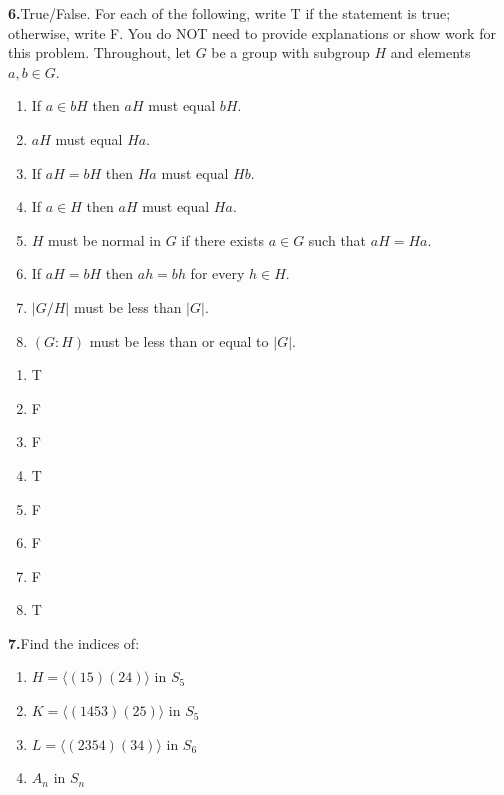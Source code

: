 \documentclass[10pt,]{book}
\theoremstyle{plain}
\theoremstyle{definition}
\theoremstyle{definition}
\theoremstyle{definition}
\theoremstyle{definition}
\numberwithin{equation}{section}
\begin{document}
%
\par\smallskip
\noindent\textbf{6.}\quad{}True/False. For each of the following, write T if the statement is true; otherwise, write F. You do NOT need to provide explanations or show work for this problem. Throughout, let \(G\) be a group with subgroup \(H\) and elements \(a,b\in G\). \leavevmode%
\begin{enumerate}[label=(\alph*)]
\item\hypertarget{li-464}{}If \(a\in bH\) then \(aH\) must equal \(bH\).%
\item\hypertarget{li-465}{}\(aH\) must equal \(Ha\).%
\item\hypertarget{li-466}{}If \(aH=bH\) then \(Ha\) must equal \(Hb\).%
\item\hypertarget{li-467}{}If \(a\in H\) then \(aH\) must equal \(Ha\).%
\item\hypertarget{li-468}{}\(H\) must be normal in \(G\) if there exists \(a\in G\) such that \(aH=Ha\).%
\item\hypertarget{li-469}{}If \(aH=bH\) then \(ah=bh\) for every \(h\in H\).%
\item\hypertarget{li-470}{}\(|G/H|\) must be less than \(|G|\).%
\item\hypertarget{li-471}{}\((G:H)\) must be less than or equal to \(|G|\).%
\end{enumerate}
%
\par\smallskip
\leavevmode%
\begin{multicols}{4}
\begin{enumerate}[label=(\alph*)]
\item\hypertarget{li-472}{}T%
\item\hypertarget{li-473}{}F%
\item\hypertarget{li-474}{}F%
\item\hypertarget{li-475}{}T%
\item\hypertarget{li-476}{}F%
\item\hypertarget{li-477}{}F%
\item\hypertarget{li-478}{}F%
\item\hypertarget{li-479}{}T%
\end{enumerate}
\end{multicols}
\par\smallskip
\noindent\textbf{7.}\quad{}Find the indices of: \leavevmode%
\begin{enumerate}[label=(\alph*)]
\item\hypertarget{li-480}{}\(H=\langle (15)(24)\rangle\) in \(S_5\)%
\item\hypertarget{li-481}{}\(K=\langle (1453)(25)\rangle\) in \(S_5\)%
\item\hypertarget{li-482}{}\(L=\langle (2354)(34)\rangle\) in \(S_6\)%
\item\hypertarget{li-483}{}\(A_n\) in \(S_n\)%
\end{enumerate}
\end{document}
